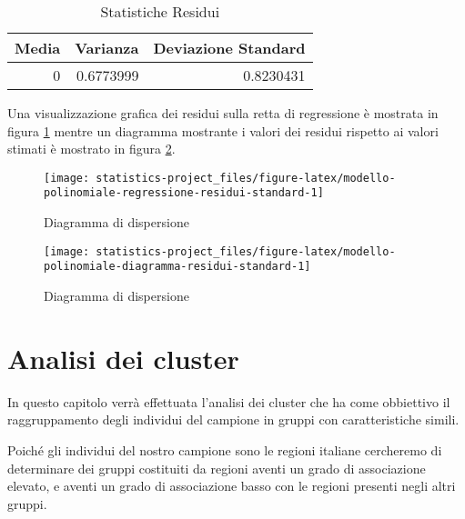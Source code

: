\documentclass[]{book}
\begin{document}
\begin{table}

\caption{\label{tab:modello-polinomiale-residui-statistiche}Statistiche Residui}
\centering
\begin{tabular}[t]{r|r|r}
\hline
Media & Varianza & Deviazione Standard\\
\hline
0 & 0.6773999 & 0.8230431\\
\hline
\end{tabular}
\end{table}

Una visualizzazione grafica dei residui sulla retta di regressione è
mostrata in figura
\ref{fig:modello-polinomiale-regressione-residui-standard} mentre un
diagramma mostrante i valori dei residui rispetto ai valori stimati è
mostrato in figura
\ref{fig:modello-polinomiale-diagramma-residui-standard}.

\begin{figure}

{\centering \texttt{[image: statistics-project\_files/figure-latex/modello-polinomiale-regressione-residui-standard-1]} 

}

\caption{Diagramma di dispersione}\label{fig:modello-polinomiale-regressione-residui-standard}
\end{figure}

\begin{figure}

{\centering \texttt{[image: statistics-project\_files/figure-latex/modello-polinomiale-diagramma-residui-standard-1]} 

}

\caption{Diagramma di dispersione}\label{fig:modello-polinomiale-diagramma-residui-standard}
\end{figure}

\chapter{Analisi dei cluster}\label{analisi-dei-cluster}

In questo capitolo verrà effettuata l'analisi dei cluster che ha come
obbiettivo il raggruppamento degli individui del campione in gruppi con
caratteristiche simili.

Poiché gli individui del nostro campione sono le regioni italiane
cercheremo di determinare dei gruppi costituiti da regioni aventi un
grado di associazione elevato, e aventi un grado di associazione basso
con le regioni presenti negli altri gruppi.
\end{document}
